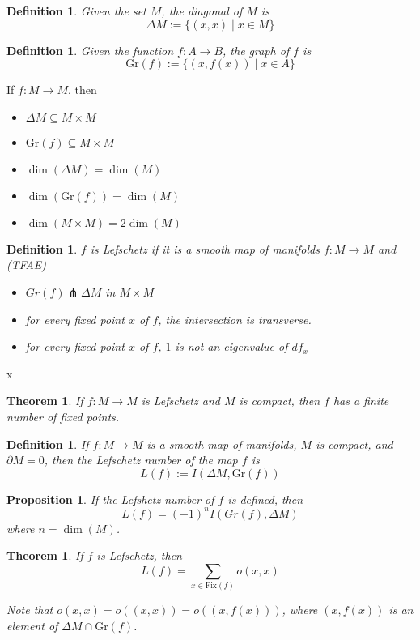 \documentclass[11pt]{amsbook}
\theoremstyle{mystyle} \newtheorem{thrm}[thm]{Theorem}
\theoremstyle{mystyle} \newtheorem{defi}[thm]{Definition}
\theoremstyle{mystyle} \newtheorem{coro}[thm]{Corollary}
\theoremstyle{mystyle} \newtheorem{propo}[thm]{Proposition}
\theoremstyle{mystyle} \newtheorem{lemm}[thm]{Lemma}
\numberwithin{thm}{section}
\newcommand{\Fix}{\text{Fix}}
\newcommand{\Gr}{\text{Gr}}
\renewcommand{\d}{\partial}
\newcommand{\transverse}{\pitchfork}
\newcommand{\x}{\times}
\newcommand{\de}{\emph}
\begin{document}
\begin{defi}
	Given the set $M$, the \de{diagonal} of $M$ is $$\Delta M := \{ (x,x) \mid x \in M \}$$
\end{defi}
\begin{defi}
	Given the function $f: A \to B$, the \de{graph} of $f$ is $$\Gr(f) := \{ (x, f(x)) \mid x \in A \}$$
\end{defi}
\begin{rmk}
	If $f: M \to M$, then
	\begin{itemize}
		\item $\Delta M \subseteq M \x M$
		\item $\Gr(f) \subseteq M \x M$
		\item $\dim(\Delta M) = \dim(M)$
		\item $\dim(\Gr(f)) = \dim(M)$
		\item $\dim(M \x M) = 2\dim(M)$
	\end{itemize}
\end{rmk}
\begin{defi}
	$f$ is \de{Lefschetz} if it is a smooth map of manifolds $f: M \to M$ and (TFAE)
	\begin{itemize}
		\item $Gr(f) \transverse \Delta M$ in $M \x M$
		\item for every fixed point $x$ of $f$, the intersection is transverse.
		\item for every fixed point $x$ of $f$, $1$ is not an eigenvalue of $df_x$
	\end{itemize}
\end{defi}

x\begin{thrm}
	If $f: M \to M$ is Lefschetz and $M$ is compact, then $f$ has a finite number of fixed points.
\end{thrm}
\begin{defi}
	If $f : M \to M$ is a smooth map of manifolds, $M$ is compact, and $\d M = 0$, then the \de{Lefschetz number} of the map $f$ is $$L(f) := I(\Delta M, \Gr(f))$$
\end{defi}
\begin{propo}
	If the Lefshetz number of $f$ is defined, then $$L(f) = (-1)^n I(Gr(f), \Delta M)$$ where $n = \dim(M)$.
\end{propo}
\begin{thrm}
	If $f$ is Lefschetz, then $$L(f) = \sum_{x \in \Fix(f)} o(x,x)$$

	Note that $o(x,x) = o((x,x)) = o((x,f(x)))$, where $(x, f(x))$ is an element of $\Delta M \cap \Gr(f)$.
\end{thrm}
\end{document}

